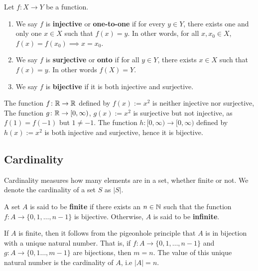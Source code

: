 \begin{defbox}
   Let $f \colon X \to Y$ be a function.
   \begin{enumerate}
      \item We say $f$ is \textbf{injective} or \textbf{one-to-one} if for every $y \in Y$, there exists one and only one $x \in X$ such that $f(x) = y$. In other words, for all $x, x_0 \in X$, $f(x) = f(x_0) \implies x = x_0$.
      \item We say $f$ is \textbf{surjective} or \textbf{onto} if for all $y \in Y$, there exists $x \in X$ such that $f(x) = y$. In other words $f(X) = Y$.
      \item We say $f$ is \textbf{bijective} if it is both injective and surjective.
   \end{enumerate}
\end{defbox}
\begin{example}
   The function $f \colon \mathbb{R} \to \mathbb{R}$ defined by $f(x) := x^2$ is neither injective nor surjective, The function $g \colon \mathbb{R} \to [0, \infty)$, $g(x) := x^2$ is surjective but not injective, as $f(1) = f(-1)$ but $1 \neq -1$. The function $h \colon [0, \infty) \to [0, \infty)$ defined by $h(x) := x^2$ is both injective and surjective, hence it is bijective. 
\end{example}


\subsection{Cardinality}

Cardinality measures how many elements are in a set, whether finite or not. We denote the cardinality of a set $S$ as $|S|$. 

\begin{defbox}
   A set $A$ is said to be \textbf{finite} if there exists an $n \in \mathbb{N}$ such that the function $f \colon A \to \{0, 1, \dots, n - 1\}$ is bijective. Otherwise, $A$ is said to be \textbf{infinite}. 
\end{defbox}

\begin{remark}
   If $A$ is finite, then it follows from the pigeonhole principle that $A$ is in bijection with a unique natural number. That is, if $f \colon A \to \{0, 1, \dots, n - 1\}$ and $g \colon A \to \{0, 1 \dots, m - 1\}$ are bijections, then $m = n$. The value of this unique natural number is the cardinality of $A$, i.e $|A| = n$.
\end{remark}


